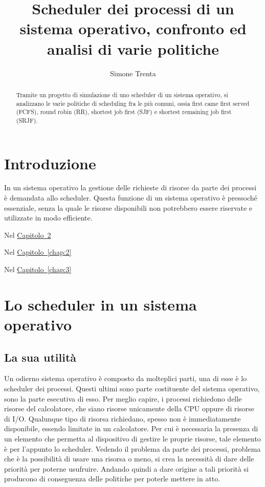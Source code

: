\documentclass[Lau, oneside]{sapthesis}%
\title{Scheduler dei processi di un sistema operativo, confronto ed analisi di varie politiche}
\author{Simone Trenta}
\begin{document}
\frontmatter
\maketitle

\begin{abstract}
Tramite un progetto di simulazione di uno scheduler di un sistema operativo, si analizzano le varie politiche di scheduling fra le più comuni, ossia first came first served (FCFS), round robin (RR), shortest job first (SJF) e shortest remaining job first (SRJF).
\end{abstract}

\tableofcontents

\mainmatter
\chapter{Introduzione}
\lettrine[lines=2, findent=3pt, nindent=0pt]{I}{}n un sistema operativo la gestione delle richieste di risorse da parte dei processi è demandata allo scheduler.
Questa funzione di un sistema operativo è pressoché essenziale, senza la quale le risorse disponibili non potrebbero essere riservate e utilizzate in modo efficiente.

\bigskip
Nel \hyperref[chap:1]{Capitolo~\ref*{chap:1}}

\bigskip
Nel \hyperref[chap:2]{Capitolo~\ref*{chap:2}} 

\bigskip
Nel \hyperref[chap:3]{Capitolo~\ref{chap:3}} 

\chapter{Lo scheduler in un sistema operativo}
\label{chap:1} 
\section{La sua utilità}
\label{sec:utilita}
Un odierno sistema operativo è composto da molteplici parti, una di esse è lo scheduler dei processi.
Questi ultimi sono parte costituente del sistema operativo, sono la parte esecutiva di esso.
Per meglio capire, i processi richiedono delle risorse del calcolatore, che siano risorse unicamente della CPU oppure di risorse di I/O.
Qualunque tipo di risorsa richiedano, spesso non è immediatamente disponibile, essendo limitate in un calcolatore.
Per cui è necessaria la presenza di un elemento che permetta al dispositivo di gestire le proprie risorse, tale elemento è per l'appunto lo scheduler.
Vedendo il problema da parte dei processi, problema che è la possibilità di usare una risorsa o meno, si crea la necessità di dare delle priorità per poterne usufruire.
Andando quindi a dare origine a tali priorità si producono di conseguenza delle politiche per poterle mettere in atto.
\end{document}
